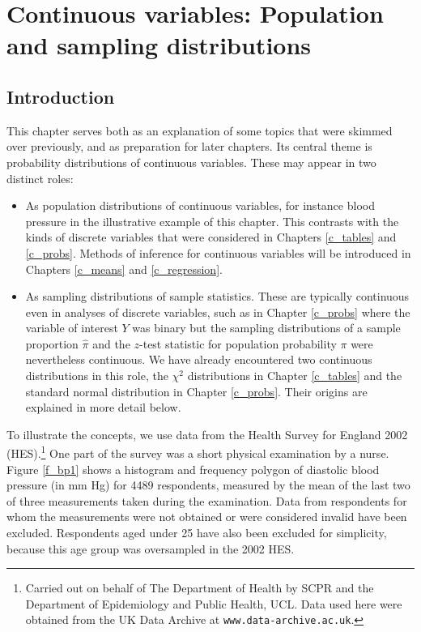 \chapter[Continuous distributions]{Continuous variables: Population and sampling distributions}
\label{c_contd}

\section{Introduction}
\label{s_contd_intro}

This chapter serves both as an explanation of some topics that
were skimmed over previously, and as preparation for later
chapters. Its central theme is probability distributions
of continuous variables. These may appear
in two distinct roles:
\begin{itemize}
\item
As population distributions of continuous variables, for instance blood
pressure in the illustrative example of this chapter. This contrasts with
the kinds of discrete variables that were considered in Chapters
\ref{c_tables} and \ref{c_probs}. Methods of inference for continuous
variables will be introduced in Chapters \ref{c_means} and
\ref{c_regression}.
\item
As sampling distributions of sample statistics. These are
typically continuous even in analyses of discrete variables, such as in
Chapter \ref{c_probs} where the variable of interest $Y$ was binary but
the sampling distributions of a sample proportion $\hat{\pi}$ and
the $z$-test statistic for population probability $\pi$ were
nevertheless continuous. We have already encountered two continuous
distributions in this role, the $\chi^{2}$ distributions in Chapter
\ref{c_tables} and the standard normal distribution in Chapter
\ref{c_probs}. Their origins are explained in more detail below.
\end{itemize}


\label{p_bpressure_ex}

To illustrate the concepts, we use data from the Health Survey for
England 2002 (HES).\footnote{Carried out on behalf of The Department of
Health by SCPR and the Department of Epidemiology and Public Health,
UCL. Data used here were obtained from the UK Data Archive at
\texttt{www.data-archive.ac.uk}.} One part of the survey was a short
physical examination by a nurse. Figure \ref{f_bp1} shows a histogram
and frequency polygon of diastolic blood pressure (in mm Hg) for 4489
respondents, measured by the mean of the last two of three measurements
taken during the examination. Data from respondents for whom the
measurements were not obtained or were considered invalid have been
excluded. Respondents aged under 25 have also been excluded for
simplicity, because this age group was oversampled in the 2002 HES.

